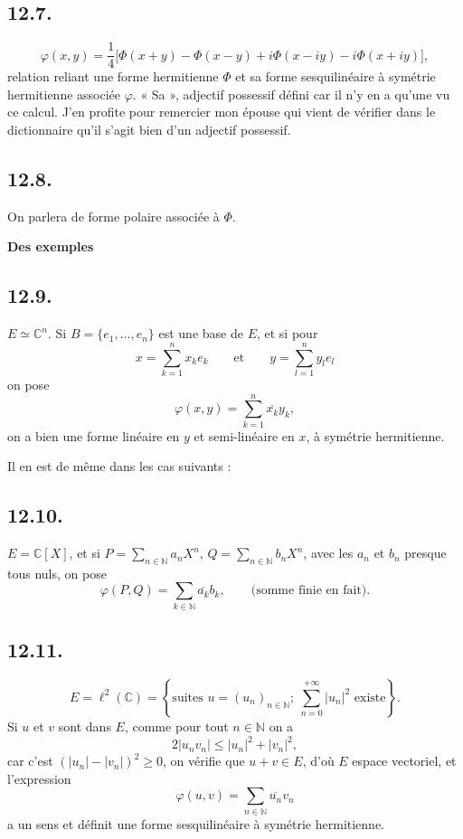 \subsection*{12.7.}
\[
\varphi(x,y)=\frac14\bigl[\Phi(x+y)-\Phi(x-y)+i\Phi(x-iy)-i\Phi(x+iy)\bigr],
\]
relation reliant une forme hermitienne $\Phi$ et sa forme sesquilinéaire à symétrie hermitienne associée $\varphi$. « Sa », adjectif possessif défini car il n'y en a qu'une vu ce calcul. J'en profite pour remercier mon épouse qui vient de vérifier dans le dictionnaire qu'il s'agit bien d'un adjectif possessif.

\subsection*{12.8.}
On parlera de forme polaire associée à $\Phi$.

\medskip\noindent\textbf{Des exemples}

\subsection*{12.9.}
$E\simeq\mathbb C^n$. Si $B=\{e_1,\ldots,e_n\}$ est une base de $E$, et si pour
\[
x=\sum_{k=1}^n x_ke_k\qquad\text{et}\qquad y=\sum_{l=1}^n y_le_l
\]
on pose
\[
\varphi(x,y)=\sum_{k=1}^n\overline{x_k}y_k,
\]
on a bien une forme linéaire en $y$ et semi-linéaire en $x$, à symétrie hermitienne.

Il en est de même dans les cas suivants :

\subsection*{12.10.}
$E=\mathbb C[X]$, et si $P=\sum_{n\in\mathbb N}a_nX^n$, $Q=\sum_{n\in\mathbb N}b_nX^n$, avec les $a_n$ et $b_n$ presque tous nuls, on pose
\[
\varphi(P,Q)=\sum_{k\in\mathbb N}\overline{a_k}b_k,\qquad\text{(somme finie en fait).}
\]

\subsection*{12.11.}
\[
E=\ell^2(\mathbb C)=\left\{\text{suites }u=(u_n)_{n\in\mathbb N};\ \sum_{n=0}^{+\infty}|u_n|^2\text{ existe}\right\}.
\]
Si $u$ et $v$ sont dans $E$, comme pour tout $n\in\mathbb N$ on a
\[
2|u_nv_n|\le|u_n|^2+|v_n|^2,
\]
car c'est $(|u_n|-|v_n|)^2\ge0$, on vérifie que $u+v\in E$, d'où $E$ espace vectoriel, et l'expression
\[
\varphi(u,v)=\sum_{n\in\mathbb N}\overline{u_n}v_n
\]
a un sens et définit une forme sesquilinéaire à symétrie hermitienne.

